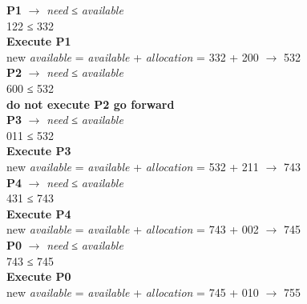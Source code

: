 \documentclass[12pt]{article}
\begin{document}
\begin{itemize}
\begin{enumerate}
\begin{flushleft}
            \textbf{P1}   $\rightarrow$  \textit{need} ≤ \textit{available} \\ 
            \hspace*{5mm} 122 ≤ 332 \\ 
            \hspace*{5mm} \textbf{Execute P1} \\ 
            \hspace*{5mm} new \textit{available} = \textit{available} + \textit{allocation} = 332 + 200 $\rightarrow$ 532 \\ 
            
            \textbf{P2}   $\rightarrow$  \textit{need} ≤ \textit{available} \\ 
            \hspace*{5mm} 600 ≤ 532 \\ 
            \hspace*{5mm} \textbf{do not execute P2 go forward} \\ 
            
            \textbf{P3}   $\rightarrow$  \textit{need} ≤ \textit{available} \\ 
            \hspace*{5mm} 011 ≤ 532 \\ 
            \hspace*{5mm} \textbf{Execute P3} \\ 
            \hspace*{5mm} new \textit{available} = \textit{available} + \textit{allocation} = 532 + 211  $\rightarrow$ 743 \\ 
            
            \textbf{P4}   $\rightarrow$  \textit{need} ≤ \textit{available} \\ 
            \hspace*{5mm} 431 ≤ 743 \\ 
            \hspace*{5mm} \textbf{Execute P4} \\ 
            \hspace*{5mm} new \textit{available} = \textit{available} + \textit{allocation} = 743 + 002  $\rightarrow$ 745 \\ 
            
            \textbf{P0}   $\rightarrow$  \textit{need} ≤ \textit{available} \\ 
            \hspace*{5mm} 743 ≤ 745 \\ 
            \hspace*{5mm} \textbf{Execute P0} \\ 
            \hspace*{5mm} new \textit{available} = \textit{available} + \textit{allocation} = 745 + 010  $\rightarrow$ 755 \\ 
            

\end{flushleft}
\end{enumerate}
\end{itemize}
\end{document}
